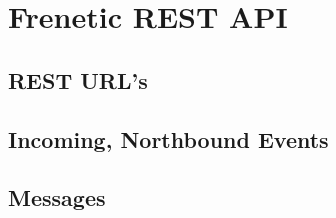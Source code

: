\chapter{Frenetic REST API}

\section{REST URL's}
 \label{frenetic_rest_api:urls}

\section{Incoming, Northbound Events}

\section{Messages}

